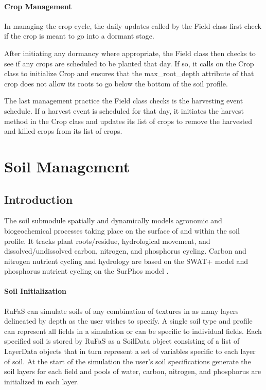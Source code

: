 \paragraph{Crop Management}
\vspace{-0.25cm}

In managing the crop cycle, the daily updates called by the Field class first check if the crop is meant to go into a dormant stage. 

After initiating any dormancy where appropriate, the Field class then checks to see if any crops are scheduled to be planted that day. If so, it calls on the Crop class to initialize Crop and ensures that the max\_root\_depth attribute of that crop does not allow its roots to go below the bottom of the soil profile.

The last management practice the Field class checks is the harvesting event schedule. If a harvest event is scheduled for that day, it initiates the harvest method in the Crop class and updates its list of crops to remove the harvested and killed crops from its list of crops. 






\section{Soil Management} 
\subsection{Introduction}
\vspace{0.2cm}

The soil submodule spatially and dynamically models agronomic and biogeochemical processes taking place on the surface of and within the soil profile. It tracks plant roots/residue, hydrological movement, and dissolved/undissolved carbon, nitrogen, and phosphorus cycling. Carbon and nitrogen nutrient cycling and hydrology are based on the SWAT+ model and phosphorus nutrient cycling on the SurPhos model \parencite{vadas2007}. 

\paragraph{Soil Initialization}
\vspace{-0.25cm}

RuFaS can simulate soils of any combination of textures in as many layers delineated by depth as the user wishes to specify. A single soil type and profile can represent all fields in a simulation or can be specific to individual fields. Each specified soil is stored by RuFaS as a SoilData object consisting of a list of LayerData objects that in turn represent a set of variables specific to each layer of soil. At the start of the simulation the user's soil specifications generate the soil layers for each field and pools of water, carbon, nitrogen, and phosphorus are initialized in each layer.


